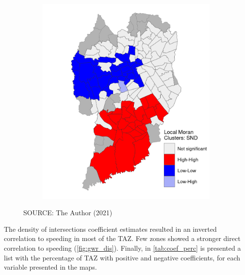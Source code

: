 \begin{figure}[!htbp]
\begin{subfigure}{0.5\textwidth}
        \includegraphics{fig/lisa_SND.png}
    \end{subfigure}    
    \label{fig:gwr_snd}
    \par SOURCE: The Author (2021)
\end{figure}

The density of intersections coefficient estimates resulted in an inverted correlation to speeding in most of the TAZ. Few zones showed a stronger direct correlation to speeding (\autoref{fig:gwr_dis}). Finally, in \autoref{tab:coef_perc} is presented a list with the percentage of TAZ with positive and negative coefficients, for each variable presented in the maps. 


